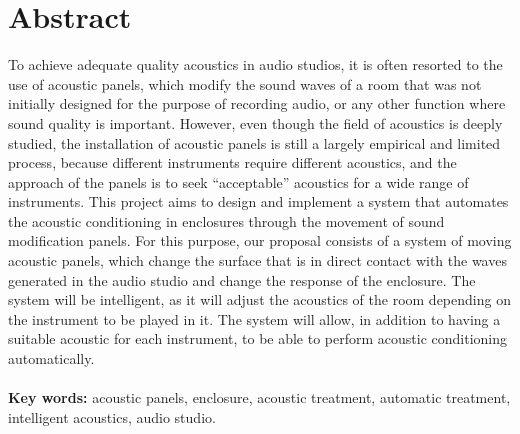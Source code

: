 \section*{Abstract}
To achieve adequate quality acoustics in audio studios, it is often resorted to the use of acoustic panels, which modify the sound waves of a room that was not initially designed for the purpose of recording audio, or any other function where sound quality is important. However, even though the field of acoustics is deeply studied, the installation of acoustic panels is still a largely empirical and limited process, because different instruments require different acoustics, and the approach of the panels is to seek ``acceptable'' acoustics for a wide range of instruments. This project aims to design and implement a system that automates the acoustic conditioning in enclosures through the movement of sound modification panels. For this purpose, our proposal consists of a system of moving acoustic panels, which change the surface that is in direct contact with the waves generated in the audio studio and change the response of the enclosure. The system will be intelligent, as it will adjust the acoustics of the room depending on the instrument to be played in it. The system will allow, in addition to having a suitable acoustic for each instrument, to be able to perform acoustic conditioning automatically.
\\
\\
\textbf{Key words:} acoustic panels, enclosure, acoustic treatment, automatic treatment, intelligent acoustics, audio studio.